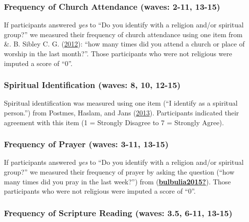 \documentclass[
  singlecolumn]{report}
\begin{document}
\hypertarget{frequency-of-church-attendance-waves-2-11-13-15}{%
\subsubsection{Frequency of Church Attendance (waves: 2-11,
13-15)}\label{frequency-of-church-attendance-waves-2-11-13-15}}

If participants answered \emph{yes} to ``Do you identify with a religion
and/or spiritual group?'' we measured their frequency of church
attendance using one item from \&. B. Sibley C. G.
(\protect\hyperlink{ref-sibley2012}{2012}): ``how many times did you
attend a church or place of worship in the last month?''. Those
participants who were not religious were imputed a score of ``0''.

\hypertarget{spiritual-identification-waves-8-10-12-15}{%
\subsubsection{Spiritual Identification (waves: 8, 10,
12-15)}\label{spiritual-identification-waves-8-10-12-15}}

Spiritual identification was measured using one item (``I identify as a
spiritual person.'') from Postmes, Haslam, and Jans
(\protect\hyperlink{ref-postmes_single-item_2013}{2013}). Participants
indicated their agreement with this item (1 = Strongly Disagree to 7 =
Strongly Agree).

\hypertarget{frequency-of-prayer-waves-3-11-13-15}{%
\subsubsection{Frequency of Prayer (waves: 3-11,
13-15)}\label{frequency-of-prayer-waves-3-11-13-15}}

If participants answered \emph{yes} to ``Do you identify with a religion
and/or spiritual group?'' we measured their frequency of prayer by
asking the question (``how many times did you pray in the last week?'')
from (\protect\hyperlink{ref-bulbulia2015}{\textbf{bulbulia2015?}}).
Those participants who were not religious were imputed a score of ``0''.

\hypertarget{frequency-of-scripture-reading-waves-3.5-6-11-13-15}{%
\subsubsection{Frequency of Scripture Reading (waves: 3.5, 6-11,
13-15)}\label{frequency-of-scripture-reading-waves-3.5-6-11-13-15}}
\end{document}
